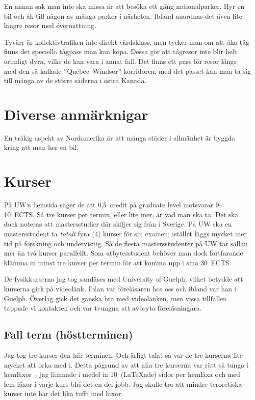 \documentclass[11pt,a4paper, english, swedish]{article}
\begin{document}
En annan sak man inte ska missa är att besöka ett gäng
nationalparker. Hyr en bil och åk till någon av många parker i
närheten. Ibland anordnas det även lite längre resor med
övernattning. 

Tyvärr är kollektivtrafiken inte direkt värdsklass, men tycker man om
att åka tåg finns det speciella tågpass man kan köpa. Dessa gör att
tågresor inte blir helt orimligt dyra, vilke de kan vara i annat
fall. Det finns ett pass för resor längs med den så kallade
''Québec--Windsor''-korridoren; med det passet kan man ta sig till
många av de större säderna i östra Kanada. 



\section{Diverse anmärknigar}

En tråkig aspekt av Nordamerika är att många städer i allmänhet är
byggda kring att man her en bil. 







\section{Kurser}
På UW:s hemsida säger de att 0,5~credit på graduate level motsvarar
9--10~ECTS. Så tre kurser per termin, eller lite mer, är vad man ska
ta. Det ska dock noteras att mastersstudier där skiljer sig från i
Sverige. På UW ska en mastersstudent ta \emph{totalt} fyra (4) kurser
för sin examen; istället läggs mycket mer tid på forskning och
undervisnig. Så de flesta mastersstudenter på UW tar sällan mer än två
kurser parallellt. Som utbytesstudent behöver man dock fortfarande
klämma in minst tre kurser per termin för att komma upp i sina
30~ECTS. 

De fysikkurserna jag tog samläses med University of Guelph, vilket
betydde att kurserna gick på videolänk. Iblan var föreläsaren hos oss
och ibland var han i Guelph. Överlag gick det ganska bra med
videolänken, men vissa tillfällen tappade vi kontakten och var tvungna
att avbryta föreläsningara. 

\subsection{Fall term (höstterminen)}
Jag tog tre kurser den här terminen. Och ärligt talat så var de tre
kurserna lite mycket att orka med i. Detta pågrund av att alla tre
kurserna var rätt så tunga i hemläxor -- jag lämnade i medel in
10~(\LaTeX{}ade) sidor per hemläxa och med fem läxor i varje kurs blri det en del
jobb. Jag skulle tro att mindre teroretiska kurser inte har det lika
tufft med läxor.
\end{document}
